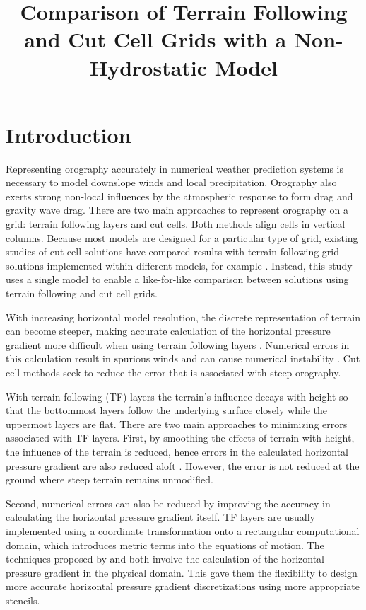 \documentclass[twocol]{ametsoc}
\title{Comparison of Terrain Following and Cut Cell Grids with a Non-Hydrostatic Model}
\affiliation{}
\begin{document}
\newcommand{\TODO}[1]{\textcolor{purple}{TODO: \emph{#1}}}

\maketitle

\section{Introduction}
Representing orography accurately in numerical weather prediction systems is necessary to model downslope winds and local precipitation.  Orography also exerts strong non-local influences by the atmospheric response to form drag and gravity wave drag.  There are two main approaches to represent orography on a grid: terrain following layers and cut cells.  Both methods align cells in vertical columns.  Because most models are designed for a particular type of grid, existing studies of cut cell solutions have compared results with terrain following grid solutions implemented within different models, for example \citet{good2014}.  Instead, this study uses a single model to enable a like-for-like comparison between solutions using terrain following and cut cell grids.

With increasing horizontal model resolution, the discrete representation of terrain can become steeper, making accurate calculation of the horizontal pressure gradient more difficult when using terrain following layers \citep{gary1973,steppeler2002}.  Numerical errors in this calculation result in spurious winds and can cause numerical instability \citep{fast2003,webster2003}.  Cut cell methods seek to reduce the error that is associated with steep orography.

With terrain following (TF) layers the terrain's influence decays with height so that the bottommost layers follow the underlying surface closely while the uppermost layers are flat.  There are two main approaches to minimizing errors associated with TF layers.  First, by smoothing the effects of terrain with height, the influence of the terrain is reduced, hence errors in the calculated horizontal pressure gradient are also reduced aloft \citep{schaer2002,leuenberger2010,klemp2011}.  However, the error is not reduced at the ground where steep terrain remains unmodified.

Second, numerical errors can also be reduced by improving the accuracy in calculating the horizontal pressure gradient itself.  TF layers are usually implemented using a coordinate transformation onto a rectangular computational domain, which introduces metric terms into the equations of motion.  The techniques proposed by \citet{klemp2011} and \cite{zaengl2012} both involve the calculation of the horizontal pressure gradient in the physical domain.  This gave them the flexibility to design more accurate horizontal pressure gradient discretizations using more appropriate stencils.
\end{document}
